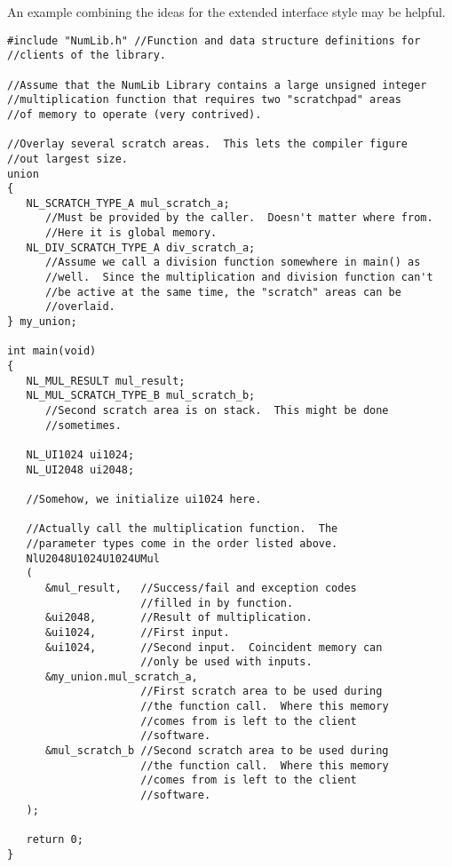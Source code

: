 An example combining the ideas for the extended interface 
style may be helpful.  

\begin{verbatim}
#include "NumLib.h" //Function and data structure definitions for //clients of the library.

//Assume that the NumLib Library contains a large unsigned integer
//multiplication function that requires two "scratchpad" areas
//of memory to operate (very contrived).

//Overlay several scratch areas.  This lets the compiler figure
//out largest size.
union
{
   NL_SCRATCH_TYPE_A mul_scratch_a;
      //Must be provided by the caller.  Doesn't matter where from.
      //Here it is global memory.
   NL_DIV_SCRATCH_TYPE_A div_scratch_a;
      //Assume we call a division function somewhere in main() as
      //well.  Since the multiplication and division function can't
      //be active at the same time, the "scratch" areas can be
      //overlaid.
} my_union;

int main(void)
{
   NL_MUL_RESULT mul_result;
   NL_MUL_SCRATCH_TYPE_B mul_scratch_b;
      //Second scratch area is on stack.  This might be done
      //sometimes.

   NL_UI1024 ui1024;
   NL_UI2048 ui2048;

   //Somehow, we initialize ui1024 here.

   //Actually call the multiplication function.  The
   //parameter types come in the order listed above.
   NlU2048U1024U1024UMul
   (
      &mul_result,   //Success/fail and exception codes
                     //filled in by function.
      &ui2048,       //Result of multiplication.
      &ui1024,       //First input.
      &ui1024,       //Second input.  Coincident memory can
                     //only be used with inputs.
      &my_union.mul_scratch_a,
                     //First scratch area to be used during
                     //the function call.  Where this memory
                     //comes from is left to the client
                     //software.
      &mul_scratch_b //Second scratch area to be used during
                     //the function call.  Where this memory
                     //comes from is left to the client
                     //software.
   );

   return 0;
}
\end{verbatim}


